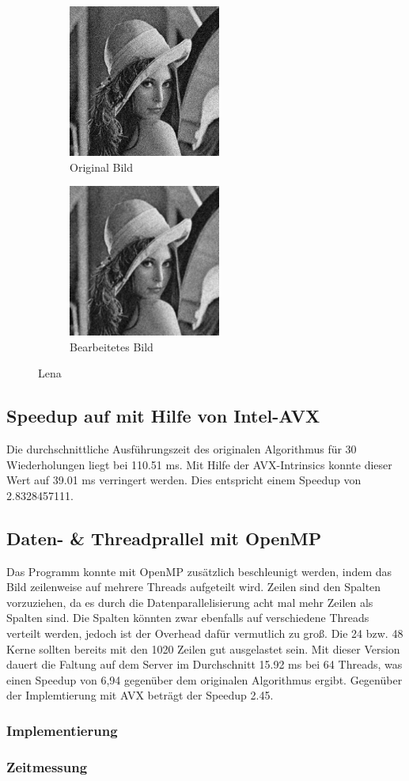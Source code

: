 \documentclass[12pt,a4paper]{article}
\begin{document}
\begin{figure}[h]
  \begin{subfigure}{0.5\textwidth}
    \includegraphics[width=0.9\linewidth, height=5cm]{../lena.jpg}
    \caption{Original Bild}
    \label{fig:subim2}
  \end{subfigure}
  \begin{subfigure}{0.5\textwidth}
    \includegraphics[width=0.9\linewidth, height=5cm]{../lenaout.jpg}
    \caption{Bearbeitetes Bild}
    \label{fig:subim1}
  \end{subfigure}
  \caption{Lena}
  \label{fig:image2}
\end{figure}

\subsection{Speedup auf mit Hilfe von Intel-AVX}
Die durchschnittliche Ausführungszeit des originalen Algorithmus für 30 Wiederholungen liegt bei 110.51 ms. Mit Hilfe der AVX-Intrinsics konnte dieser Wert auf 39.01 ms verringert werden. Dies entspricht einem Speedup von 2.8328457111.
\subsection{Daten- \& Threadprallel mit OpenMP}
Das Programm konnte mit OpenMP zusätzlich beschleunigt werden, indem das Bild zeilenweise auf mehrere Threads aufgeteilt wird. Zeilen sind den Spalten vorzuziehen, da es durch die Datenparallelisierung acht mal mehr Zeilen als Spalten sind. Die Spalten könnten zwar ebenfalls auf verschiedene Threads verteilt werden, jedoch ist der Overhead dafür vermutlich zu groß. Die 24 bzw. 48 Kerne sollten bereits mit den 1020 Zeilen gut ausgelastet sein. Mit dieser Version dauert die Faltung auf dem Server im Durchschnitt 15.92 ms bei 64 Threads, was einen Speedup von 6,94 gegenüber dem originalen Algorithmus ergibt. Gegenüber der Implemtierung mit AVX beträgt der Speedup 2.45.
\subsubsection{Implementierung}

\subsubsection{Zeitmessung}

\end{document}
